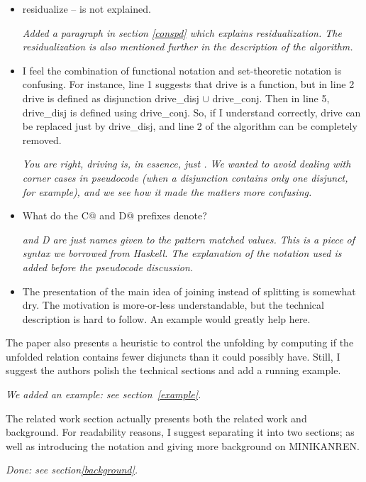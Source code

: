 \begin{itemize}
 \item residualize -- is not explained.

 \emph{Added a paragraph in section \ref{conspd} which explains residualization. The residualization is also mentioned further in the description of the algorithm.}

 \item I feel the combination of functional notation and set-theoretic notation is confusing. For instance, line 1 suggests that drive is a function, but in line 2 drive is defined as disjunction drive_disj $\cup$ drive_conj. Then in line 5, drive_disj is defined using drive_conj. So, if I understand correctly, drive can be replaced just by drive_disj, and line 2 of the algorithm can be completely removed.

\emph{You are right, driving is, in essence, just . We wanted to avoid dealing with corner cases in pseudocode (when a disjunction contains only one disjunct, for example), and we see how it made the matters more confusing.}

 \item What do the C@ and D@ prefixes denote?

\emph{ and \emph{D} are just names given to the pattern matched values. This is a piece of syntax we borrowed from Haskell. The explanation of the notation used is added before the pseudocode discussion.}

 \item The presentation of the main idea of joining instead of splitting is somewhat dry. The motivation is more-or-less understandable, but the technical description is hard to follow. An example would greatly help here.
\end{itemize}

The paper also presents a heuristic to control the unfolding by computing if the unfolded relation contains fewer disjuncts than it could possibly have. Still, I suggest the authors polish the technical sections and add a running example.

\emph{We added an example: see section~\ref{example}.}

The related work section actually presents both the related work and background. For readability reasons, I suggest separating it into two sections; as well as introducing the notation and giving more background on MINIKANREN.

\emph{Done: see section\ref{background}.}


